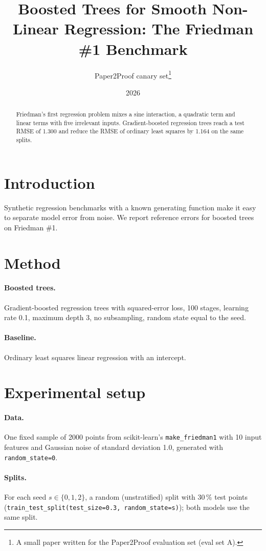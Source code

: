 \documentclass[11pt]{article}
\title{Boosted Trees for Smooth Non-Linear Regression: The Friedman \#1 Benchmark}
\author{Paper2Proof canary set\thanks{A small paper written for the Paper2Proof evaluation set (eval set A).}}
\date{2026}
\begin{document}
\maketitle

\begin{abstract}
Friedman's first regression problem mixes a sine interaction, a quadratic term and linear terms
with five irrelevant inputs. Gradient-boosted regression trees reach a test RMSE of 1.300 and
reduce the RMSE of ordinary least squares by 1.164 on the same splits.
\end{abstract}

\section{Introduction}
Synthetic regression benchmarks with a known generating function make it easy to separate model
error from noise. We report reference errors for boosted trees on Friedman \#1.

\section{Method}
\paragraph{Boosted trees.} Gradient-boosted regression trees with squared-error loss, 100
stages, learning rate 0.1, maximum depth 3, no subsampling, random state equal to the seed.
\paragraph{Baseline.} Ordinary least squares linear regression with an intercept.

\section{Experimental setup}
\paragraph{Data.} One fixed sample of 2000 points from scikit-learn's \texttt{make\_friedman1}
with 10 input features and Gaussian noise of standard deviation 1.0, generated with
\texttt{random\_state=0}.
\paragraph{Splits.} For each seed $s \in \{0, 1, 2\}$, a random (unstratified) split with 30\,\%
test points (\texttt{train\_test\_split(test\_size=0.3, random\_state=s)}); both models use the
same split.
\end{document}
